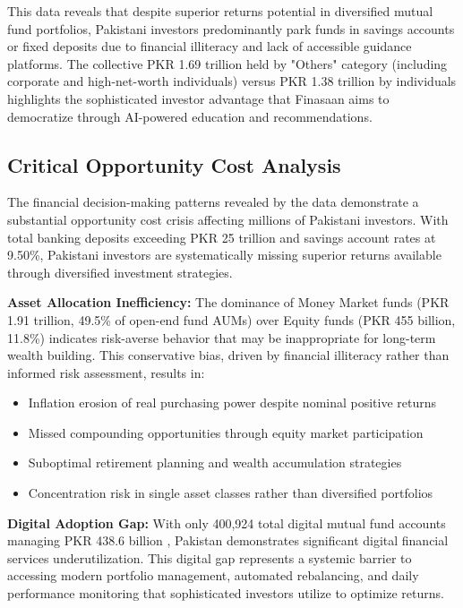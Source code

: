 \documentclass[12pt]{article}
\begin{document}
This data reveals that despite superior returns potential in diversified mutual fund portfolios, Pakistani investors predominantly park funds in savings accounts or fixed deposits due to financial illiteracy and lack of accessible guidance platforms. The collective PKR 1.69 trillion held by "Others" category (including corporate and high-net-worth individuals) versus PKR 1.38 trillion by individuals highlights the sophisticated investor advantage that Finasaan aims to democratize through AI-powered education and recommendations.

\subsection{Critical Opportunity Cost Analysis}
The financial decision-making patterns revealed by the data demonstrate a substantial opportunity cost crisis affecting millions of Pakistani investors. With total banking deposits exceeding PKR 25 trillion and savings account rates at 9.50\%, Pakistani investors are systematically missing superior returns available through diversified investment strategies.

\textbf{Asset Allocation Inefficiency:} The dominance of Money Market funds (PKR 1.91 trillion, 49.5\% of open-end fund AUMs) over Equity funds (PKR 455 billion, 11.8\%) indicates risk-averse behavior that may be inappropriate for long-term wealth building. This conservative bias, driven by financial illiteracy rather than informed risk assessment, results in:
\begin{itemize}
    \item Inflation erosion of real purchasing power despite nominal positive returns
    \item Missed compounding opportunities through equity market participation
    \item Suboptimal retirement planning and wealth accumulation strategies
    \item Concentration risk in single asset classes rather than diversified portfolios
\end{itemize}

\textbf{Digital Adoption Gap:} With only 400,924 total digital mutual fund accounts managing PKR 438.6 billion \cite{mufap2025}, Pakistan demonstrates significant digital financial services underutilization. This digital gap represents a systemic barrier to accessing modern portfolio management, automated rebalancing, and daily performance monitoring that sophisticated investors utilize to optimize returns.
\end{document}
